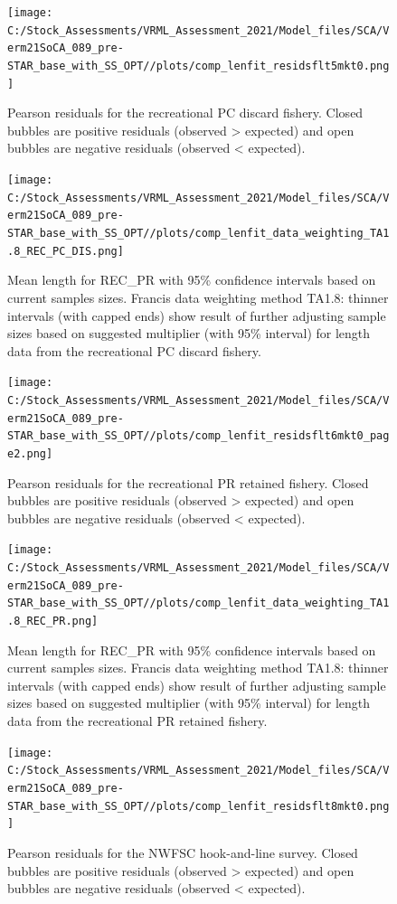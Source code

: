 \documentclass[
  english,
  a4paper,
]{article}
\begin{document}
\begin{figure}
\centering
\texttt{[image: C:/Stock\_Assessments/VRML\_Assessment\_2021/Model\_files/SCA/Verm21SoCA\_089\_pre-STAR\_base\_with\_SS\_OPT//plots/comp\_lenfit\_residsflt5mkt0.png]}
\caption{Pearson residuals for the recreational PC discard fishery. Closed bubbles are positive residuals (observed \textgreater{} expected) and open bubbles are negative residuals (observed \textless{} expected).\label{fig:len-pearson-REC_PC_DIS}}
\end{figure}

\begin{figure}
\centering
\texttt{[image: C:/Stock\_Assessments/VRML\_Assessment\_2021/Model\_files/SCA/Verm21SoCA\_089\_pre-STAR\_base\_with\_SS\_OPT//plots/comp\_lenfit\_data\_weighting\_TA1.8\_REC\_PC\_DIS.png]}
\caption{Mean length for REC\_PR with 95\% confidence intervals based on current samples sizes. Francis data weighting method TA1.8: thinner intervals (with capped ends) show result of further adjusting sample sizes based on suggested multiplier (with 95\% interval) for length data from the recreational PC discard fishery.\label{fig:mean-len-fit-REC_PC_DIS}}
\end{figure}

\begin{figure}
\centering
\texttt{[image: C:/Stock\_Assessments/VRML\_Assessment\_2021/Model\_files/SCA/Verm21SoCA\_089\_pre-STAR\_base\_with\_SS\_OPT//plots/comp\_lenfit\_residsflt6mkt0\_page2.png]}
\caption{Pearson residuals for the recreational PR retained fishery. Closed bubbles are positive residuals (observed \textgreater{} expected) and open bubbles are negative residuals (observed \textless{} expected).\label{fig:len-pearson-REC_PR}}
\end{figure}

\begin{figure}
\centering
\texttt{[image: C:/Stock\_Assessments/VRML\_Assessment\_2021/Model\_files/SCA/Verm21SoCA\_089\_pre-STAR\_base\_with\_SS\_OPT//plots/comp\_lenfit\_data\_weighting\_TA1.8\_REC\_PR.png]}
\caption{Mean length for REC\_PR with 95\% confidence intervals based on current samples sizes. Francis data weighting method TA1.8: thinner intervals (with capped ends) show result of further adjusting sample sizes based on suggested multiplier (with 95\% interval) for length data from the recreational PR retained fishery.\label{fig:mean-len-fit-REC_PR}}
\end{figure}

\begin{figure}
\centering
\texttt{[image: C:/Stock\_Assessments/VRML\_Assessment\_2021/Model\_files/SCA/Verm21SoCA\_089\_pre-STAR\_base\_with\_SS\_OPT//plots/comp\_lenfit\_residsflt8mkt0.png]}
\caption{Pearson residuals for the NWFSC hook-and-line survey. Closed bubbles are positive residuals (observed \textgreater{} expected) and open bubbles are negative residuals (observed \textless{} expected).\label{fig:len-pearson-NWFSC_HKL}}
\end{figure}
\end{document}
